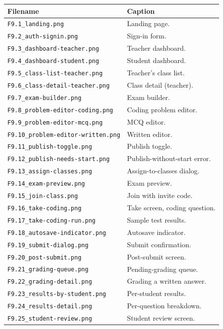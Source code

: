 \begin{longtable}{l p{8cm}}
  \toprule
  Filename & Caption \\
  \midrule
  \texttt{F9.1\_landing.png}                 & Landing page. \\
  \texttt{F9.2\_auth-signin.png}             & Sign-in form. \\
  \texttt{F9.3\_dashboard-teacher.png}       & Teacher dashboard. \\
  \texttt{F9.4\_dashboard-student.png}       & Student dashboard. \\
  \texttt{F9.5\_class-list-teacher.png}      & Teacher's class list. \\
  \texttt{F9.6\_class-detail-teacher.png}    & Class detail (teacher). \\
  \texttt{F9.7\_exam-builder.png}            & Exam builder. \\
  \texttt{F9.8\_problem-editor-coding.png}   & Coding problem editor. \\
  \texttt{F9.9\_problem-editor-mcq.png}      & MCQ editor. \\
  \texttt{F9.10\_problem-editor-written.png} & Written editor. \\
  \texttt{F9.11\_publish-toggle.png}         & Publish toggle. \\
  \texttt{F9.12\_publish-needs-start.png}    & Publish-without-start error. \\
  \texttt{F9.13\_assign-classes.png}         & Assign-to-classes dialog. \\
  \texttt{F9.14\_exam-preview.png}           & Exam preview. \\
  \texttt{F9.15\_join-class.png}             & Join with invite code. \\
  \texttt{F9.16\_take-coding.png}            & Take screen, coding question. \\
  \texttt{F9.17\_take-coding-run.png}        & Sample test results. \\
  \texttt{F9.18\_autosave-indicator.png}     & Autosave indicator. \\
  \texttt{F9.19\_submit-dialog.png}          & Submit confirmation. \\
  \texttt{F9.20\_post-submit.png}            & Post-submit screen. \\
  \texttt{F9.21\_grading-queue.png}          & Pending-grading queue. \\
  \texttt{F9.22\_grading-detail.png}         & Grading a written answer. \\
  \texttt{F9.23\_results-by-student.png}     & Per-student results. \\
  \texttt{F9.24\_results-detail.png}         & Per-question breakdown. \\
  \texttt{F9.25\_student-review.png}         & Student review screen. \\
  \bottomrule
\end{longtable}
